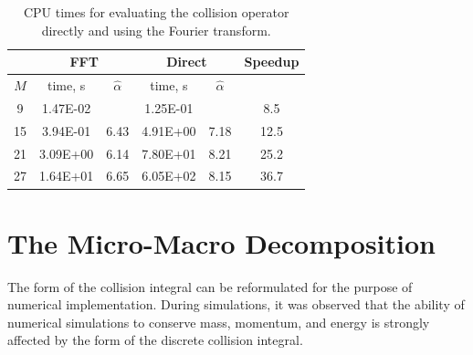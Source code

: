 \documentclass[12pt]{CSUNthesis}
\begin{document}
\begin{table}[h]
  \centering
  \begin{tabular}[c]{ c c c c c c}
    \hline 
    & \multicolumn{2}{c|}{FFT} & \multicolumn{2}{c|}{Direct} & Speedup\\
    \hline
    $M$ & time, s & $\hat{\alpha}$ & time, s & $\hat{\alpha}$ &  \\
    \hline
    9   & 1.47E-02 &         & 1.25E-01 &       & 8.5  \\
    15  & 3.94E-01 &  6.43   & 4.91E+00 &  7.18 & 12.5 \\
    21  & 3.09E+00 &  6.14   & 7.80E+01 &  8.21 & 25.2 \\
    27  & 1.64E+01 &  6.65   & 6.05E+02 &  8.15 & 36.7 \\
    \hline
  \end{tabular}
\caption{\label{tab:01} CPU times for evaluating the collision operator directly and using the Fourier transform.}
\end{table}

\section{The Micro-Macro Decomposition}
The form of the collision integral can be reformulated for the purpose of numerical implementation. During simulations, it was observed that the ability of numerical simulations to conserve mass, momentum, and energy is strongly affected by the form of the discrete collision integral. 
\end{document}
